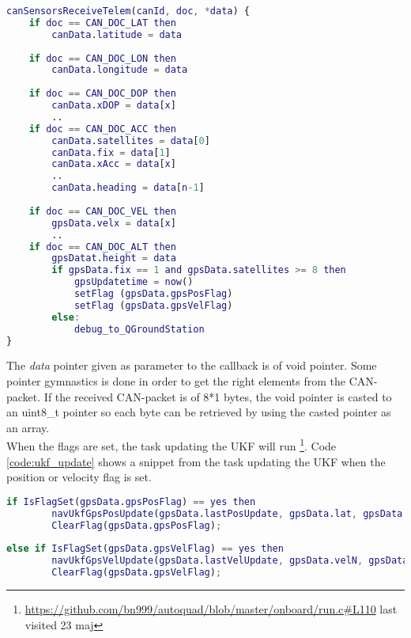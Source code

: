 \begin{lstlisting}[language = Matlab, caption = Modified callback invoked when a sensor-value is received. Shows how doc is used to tell which GPS\-packet is received and when height is received the flags are set, label=code:psudo_parse_can_gps]
canSensorsReceiveTelem(canId, doc, *data) {
	if doc == CAN_DOC_LAT then
		canData.latitude = data
		
	if doc == CAN_DOC_LON then
		canData.longitude = data
		
	if doc == CAN_DOC_DOP then
		canData.xDOP = data[x]
		..
	if doc == CAN_DOC_ACC then
		canData.satellites = data[0]
		canData.fix = data[1]
		canData.xAcc = data[x]
		..
		canData.heading = data[n-1]
		
	if doc == CAN_DOC_VEL then
		gpsData.velx = data[x]
		..		
	if doc == CAN_DOC_ALT then
		gpsDatat.height = data
		if gpsData.fix == 1 and gpsData.satellites >= 8 then
			gpsUpdatetime = now()
			setFlag (gpsData.gpsPosFlag)
			setFlag (gpsData.gpsVelFlag)
		else:
			debug_to_QGroundStation
}
\end{lstlisting}

The \textit{data} pointer given as parameter to the callback is of void pointer. Some pointer gymnastics is done in order to get the right elements from the CAN-packet. If the received CAN-packet is of 8*1 bytes, the void pointer is casted to an uint8\_t pointer so each byte can be retrieved by using the casted pointer as an array. \\

When the flags are set, the task updating the UKF will run \footnote{\url{https://github.com/bn999/autoquad/blob/master/onboard/run.c\#L110} last visited 23 maj}.
Code \ref{code:ukf_update} shows a snippet from the task updating the UKF when the position or velocity flag is set.
\begin{lstlisting}[language = Matlab, caption = Snippet of run.c as psudeocode which updates the UKF when position flag or velocity flag is set, label=code:ukf_update]
if IsFlagSet(gpsData.gpsPosFlag) == yes then
	    navUkfGpsPosUpdate(gpsData.lastPosUpdate, gpsData.lat, gpsData.lon, gpsData.height, ....);
	    ClearFlag(gpsData.gpsPosFlag);
	    
else if IsFlagSet(gpsData.gpsVelFlag) == yes then
	    navUkfGpsVelUpdate(gpsData.lastVelUpdate, gpsData.velN, gpsData.velE, ....);
	    ClearFlag(gpsData.gpsVelFlag);
\end{lstlisting}

